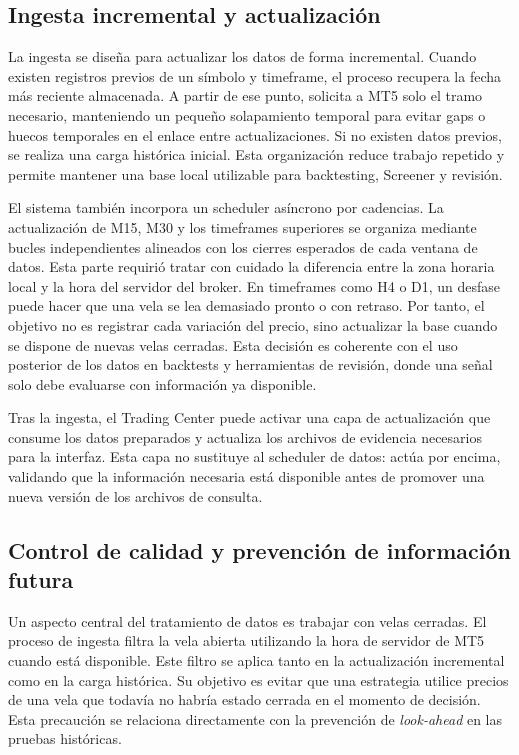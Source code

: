 \subsection{Ingesta incremental y actualizaci\'on}
\label{subsec:ingesta-incremental}

La ingesta se dise\~na para actualizar los datos de forma incremental. Cuando
existen registros previos de un s\'imbolo y timeframe, el proceso recupera la
fecha m\'as reciente almacenada. A partir de ese punto, solicita a MT5 solo el
tramo necesario, manteniendo un peque\~no solapamiento temporal para evitar
gaps o huecos temporales en el enlace entre actualizaciones. Si no existen datos previos, se realiza una
carga hist\'orica inicial. Esta organizaci\'on reduce trabajo repetido y permite
mantener una base local utilizable para backtesting, Screener y revisi\'on.

El sistema tambi\'en incorpora un scheduler as\'incrono por cadencias. La
actualizaci\'on de M15, M30 y los timeframes superiores se organiza mediante
bucles independientes alineados con los cierres esperados de cada ventana de
datos. Esta parte requiri\'o tratar con cuidado la diferencia entre la zona
horaria local y la hora del servidor del broker. En timeframes como H4 o
D1, un desfase puede hacer que una vela se lea demasiado pronto o con retraso.
Por tanto, el objetivo no es registrar cada variaci\'on del precio, sino
actualizar la base cuando se dispone de nuevas velas cerradas. Esta decisi\'on es
coherente con el uso posterior de los datos en backtests y herramientas de
revisi\'on, donde una se\~nal solo debe evaluarse con informaci\'on ya disponible.

Tras la ingesta, el Trading Center puede activar una capa de actualizaci\'on que
consume los datos preparados y actualiza los archivos de evidencia necesarios
para la interfaz. Esta capa no sustituye al
scheduler de datos: act\'ua por encima, validando que la informaci\'on necesaria
est\'a disponible antes de promover una nueva versi\'on de los archivos de consulta.

\subsection{Control de calidad y prevenci\'on de informaci\'on futura}
\label{subsec:control-calidad-datos}

Un aspecto central del tratamiento de datos es trabajar con velas cerradas. El
proceso de ingesta filtra la vela abierta utilizando la hora de servidor de MT5
cuando est\'a disponible. Este filtro se aplica tanto en la actualizaci\'on
incremental como en la carga hist\'orica. Su objetivo es evitar que una
estrategia utilice precios de una vela que todav\'ia no habr\'ia estado cerrada
en el momento de decisi\'on. Esta precauci\'on se relaciona directamente con la
prevenci\'on de \textit{look-ahead} en las pruebas hist\'oricas.

